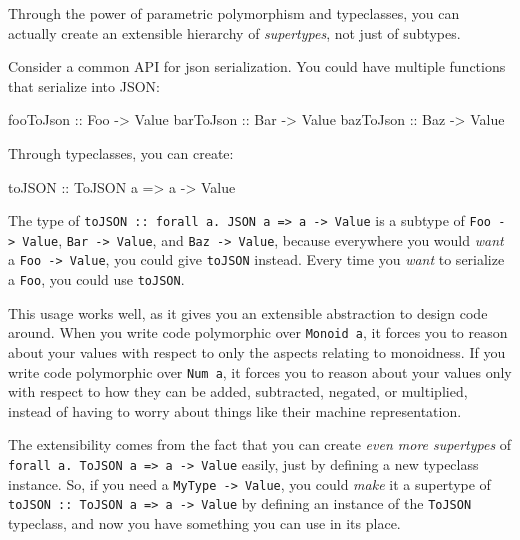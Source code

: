 \documentclass[]{article}
\newenvironment{Shaded}{}{}
\newcommand{\DataTypeTok}[1]{\textcolor[rgb]{0.56,0.13,0.00}{#1}}
\newcommand{\NormalTok}[1]{#1}
\newcommand{\OtherTok}[1]{\textcolor[rgb]{0.00,0.44,0.13}{#1}}
\begin{document}
Through the power of parametric polymorphism and typeclasses, you can actually
create an extensible hierarchy of \emph{supertypes}, not just of subtypes.

Consider a common API for json serialization. You could have multiple functions
that serialize into JSON:

\begin{Shaded}
\begin{Highlighting}[]
\OtherTok{fooToJson ::} \DataTypeTok{Foo} \OtherTok{{-}\textgreater{}} \DataTypeTok{Value}
\OtherTok{barToJson ::} \DataTypeTok{Bar} \OtherTok{{-}\textgreater{}} \DataTypeTok{Value}
\OtherTok{bazToJson ::} \DataTypeTok{Baz} \OtherTok{{-}\textgreater{}} \DataTypeTok{Value}
\end{Highlighting}
\end{Shaded}

Through typeclasses, you can create:

\begin{Shaded}
\begin{Highlighting}[]
\OtherTok{toJSON ::} \DataTypeTok{ToJSON}\NormalTok{ a }\OtherTok{=\textgreater{}}\NormalTok{ a }\OtherTok{{-}\textgreater{}} \DataTypeTok{Value}
\end{Highlighting}
\end{Shaded}

The type of
\texttt{toJSON\ ::\ forall\ a.\ JSON\ a\ =\textgreater{}\ a\ -\textgreater{}\ Value}
is a subtype of \texttt{Foo\ -\textgreater{}\ Value},
\texttt{Bar\ -\textgreater{}\ Value}, and \texttt{Baz\ -\textgreater{}\ Value},
because everywhere you would \emph{want} a \texttt{Foo\ -\textgreater{}\ Value},
you could give \texttt{toJSON} instead. Every time you \emph{want} to serialize
a \texttt{Foo}, you could use \texttt{toJSON}.

This usage works well, as it gives you an extensible abstraction to design code
around. When you write code polymorphic over \texttt{Monoid\ a}, it forces you
to reason about your values with respect to only the aspects relating to
monoidness. If you write code polymorphic over \texttt{Num\ a}, it forces you to
reason about your values only with respect to how they can be added, subtracted,
negated, or multiplied, instead of having to worry about things like their
machine representation.

The extensibility comes from the fact that you can create \emph{even more
supertypes} of
\texttt{forall\ a.\ ToJSON\ a\ =\textgreater{}\ a\ -\textgreater{}\ Value}
easily, just by defining a new typeclass instance. So, if you need a
\texttt{MyType\ -\textgreater{}\ Value}, you could \emph{make} it a supertype of
\texttt{toJSON\ ::\ ToJSON\ a\ =\textgreater{}\ a\ -\textgreater{}\ Value} by
defining an instance of the \texttt{ToJSON} typeclass, and now you have
something you can use in its place.
\end{document}
